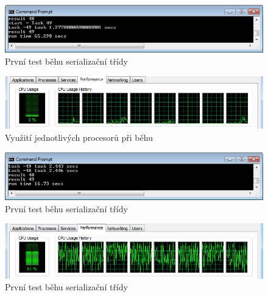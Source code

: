 \begin{figure}
\begin{centering}
\includegraphics[width=1\textwidth]{obrazky/serial_test_r1}
\par\end{centering}
\caption{První test běhu serializační třídy \label{fig:serialtestI}}
\end{figure}

\begin{figure}
\begin{centering}
\includegraphics[width=1\textwidth]{obrazky/serial_cpu_1}
\par\end{centering}
\caption{Využití jednotlivých procesorů při běhu \label{fig:serialCputestI}}
\end{figure}

\begin{figure}
\begin{centering}
\includegraphics[width=1\textwidth]{obrazky/executor_test_r1}
\par\end{centering}
\caption{První test běhu serializační třídy \label{fig:executorTestI}}

\end{figure}

\begin{figure}
\begin{centering}
\includegraphics[width=1\textwidth]{obrazky/executor_cpu_1}
\par\end{centering}
\caption{První test běhu serializační třídy \label{fig:executorCpuTestI}}

\end{figure}
